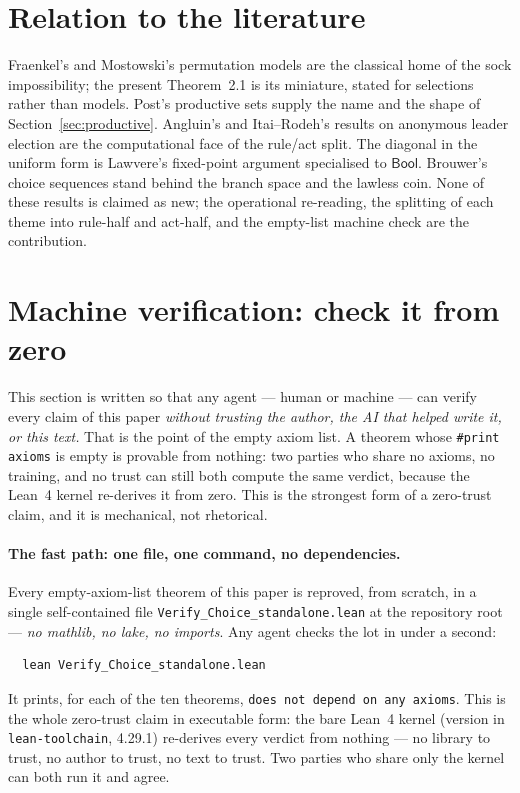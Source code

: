 \documentclass[11pt]{article}
\theoremstyle{remark}
\begin{document}
\section{Relation to the literature}

Fraenkel's and Mostowski's permutation models are the classical home of
the sock impossibility; the present Theorem~2.1 is its miniature, stated
for selections rather than models.  Post's productive sets supply the
name and the shape of Section~\ref{sec:productive}.  Angluin's and
Itai--Rodeh's results on anonymous leader election are the computational
face of the rule/act split.  The diagonal in the uniform form is
Lawvere's fixed-point argument specialised to $\mathsf{Bool}$.  Brouwer's
choice sequences stand behind the branch space and the lawless coin.
None of these results is claimed as new; the operational re-reading, the
splitting of each theme into rule-half and act-half, and the empty-list
machine check are the contribution.

\section{Machine verification: check it from zero}
\label{sec:verify}

This section is written so that any agent --- human or machine --- can
verify every claim of this paper \emph{without trusting the author, the
AI that helped write it, or this text.}  That is the point of the empty
axiom list.  A theorem whose \texttt{\#print axioms} is empty is provable
from nothing: two parties who share no axioms, no training, and no trust
can still both compute the same verdict, because the Lean~4 kernel
re-derives it from zero.  This is the strongest form of a zero-trust
claim, and it is mechanical, not rhetorical.

\paragraph{The fast path: one file, one command, no dependencies.}  Every
empty-axiom-list theorem of this paper is reproved, from scratch, in a
single self-contained file \texttt{Verify\_Choice\_standalone.lean} at the
repository root --- \emph{no mathlib, no lake, no imports}.  Any agent
checks the lot in under a second:
\begin{verbatim}
  lean Verify_Choice_standalone.lean
\end{verbatim}
It prints, for each of the ten theorems, \texttt{does not depend on any
axioms}.  This is the whole zero-trust claim in executable form: the
bare Lean~4 kernel (version in \texttt{lean-toolchain}, 4.29.1)
re-derives every verdict from nothing --- no library to trust, no author
to trust, no text to trust.  Two parties who share only the kernel can
both run it and agree.
\end{document}
